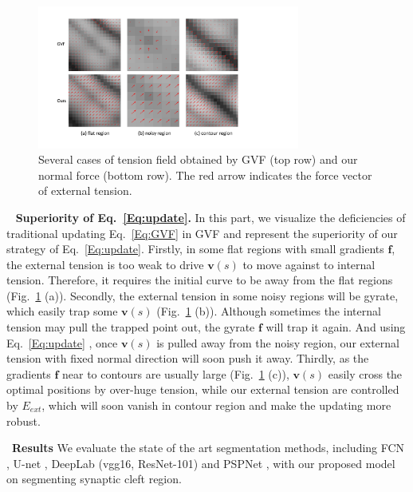 \begin{figure}[t]
\begin{center}
        \includegraphics[width=3.4in]{figs/FigGVF.pdf}
   \end{center}
%
\caption{Several cases of tension field obtained by GVF (top row) and our normal force (bottom row). The red arrow indicates the force vector of external tension.}
\label{fig:gvf}
\end{figure}
~ \noindent\textbf{Superiority of Eq.~\ref{Eq:update}.}
In this part, we visualize the deficiencies of traditional updating Eq.~\ref{Eq:GVF} in GVF and represent the superiority of our strategy of Eq.~\ref{Eq:update}.
Firstly, in some flat regions with small gradients $\mathbf{f}$, the external tension is too weak to drive $\mathbf{v}(s)$ to move against to internal tension.
Therefore, it requires the initial curve to be away from the flat regions (Fig.~\ref{fig:gvf} (a)).
Secondly, the external tension in some noisy regions will be gyrate, which easily trap some $\mathbf{v}(s)$ (Fig.~\ref{fig:gvf} (b)).
Although sometimes the internal tension may pull the trapped point out, the gyrate $\mathbf{f}$ will trap it again.
And using Eq.~\ref{Eq:update} , once $\mathbf{v}(s)$ is pulled away from the noisy region, our external tension with fixed normal direction will soon push it away.
Thirdly, as the gradients $\mathbf{f}$ near to contours are usually large (Fig.~\ref{fig:gvf} (c)), $\mathbf{v}(s)$ easily cross the optimal positions by over-huge tension, while our external tension are controlled by $E_{ext}$, which will soon vanish in contour region and make the updating more robust.

~\noindent\textbf{Results}
We evaluate the state of the art segmentation methods, including FCN \cite{Long2015}, U-net \cite{Ronneberger2015}, DeepLab (vgg16, ResNet-101) \cite{Chen2016a} and PSPNet \cite{Zhao2016}, with our proposed model on segmenting synaptic cleft region.

